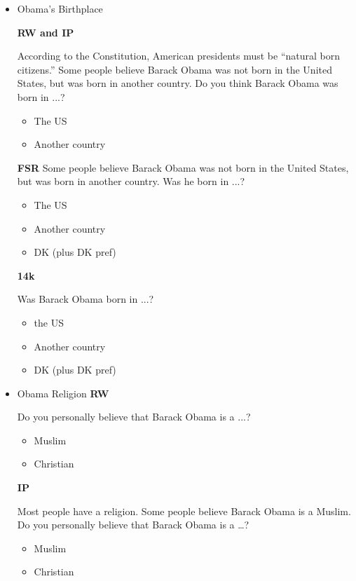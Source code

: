 \begin{itemize}
	\item Obama's Birthplace
	
	\textbf{RW and IP}\newline
	
	According to the Constitution, American presidents must be ``natural born citizens.''
	Some people believe Barack Obama was not born in the United States, but was born
	in another country. Do you think Barack Obama was born in ...?
	\begin{itemize}
		\item The US
		\item Another country
	\end{itemize}
	
	\textbf{FSR}\newline
	Some people believe Barack Obama was not born in the United States, but was born
	in another country. Was he born in ...?
	\begin{itemize}
		\item The US
		\item Another country
		\item DK (plus DK pref)
	\end{itemize}
	
	\textbf{14k}\newline
	
	Was Barack Obama born in ...?
	\begin{itemize}
		\item the US
		\item Another country
		\item DK (plus DK pref)
	\end{itemize}
	
	\item Obama Religion\newline
	\textbf{RW}\newline
	
	Do you personally believe that Barack Obama is a ...?
	\begin{itemize}
		\item Muslim
		\item Christian
	\end{itemize}
	
	\textbf{IP}\newline
	
	Most people have a religion. Some people believe Barack Obama is a Muslim. Do
	you personally believe that Barack Obama is a \ldots?
	\begin{itemize}
		\item Muslim
		\item Christian
	\end{itemize}
	

\end{itemize}
